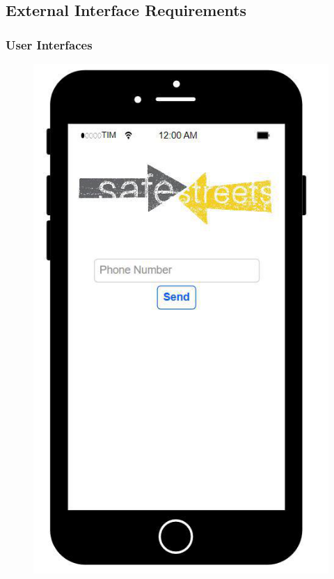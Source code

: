 \subsection{External Interface Requirements}

\subsubsection{User Interfaces}
\begin{figure}
[H]
\includegraphics[scale=0.52]{Images/Templates/User/us_0.png}

\end{figure}
